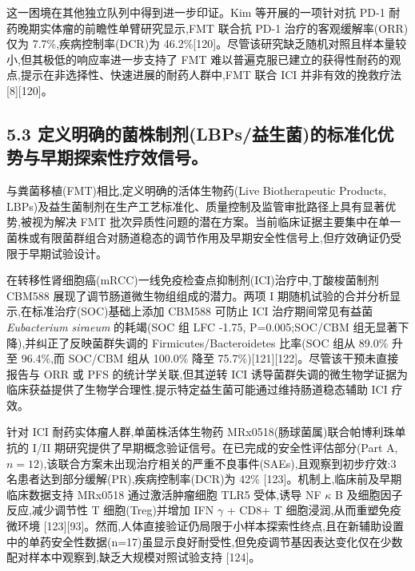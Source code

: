 这一困境在其他独立队列中得到进一步印证。Kim 等开展的一项针对抗 PD-1 耐药晚期实体瘤的前瞻性单臂研究显示,FMT 联合抗 PD-1 治疗的客观缓解率(ORR)仅为 7.7\%,疾病控制率(DCR)为 46.2\%{[}120{]}。尽管该研究缺乏随机对照且样本量较小,但其极低的响应率进一步支持了 FMT 难以普遍克服已建立的获得性耐药的观点,提示在非选择性、快速进展的耐药人群中,FMT 联合 ICI 并非有效的挽救疗法 {[}8{]}{[}120{]}。

\subsection{5.3 定义明确的菌株制剂(LBPs/益生菌)的标准化优势与早期探索性疗效信号。}\label{ux5b9aux4e49ux660eux786eux7684ux83ccux682aux5236ux5242lbpsux76caux751fux83ccux7684ux6807ux51c6ux5316ux4f18ux52bfux4e0eux65e9ux671fux63a2ux7d22ux6027ux7597ux6548ux4fe1ux53f7}

与粪菌移植(FMT)相比,定义明确的活体生物药(Live Biotherapeutic Products, LBPs)及益生菌制剂在生产工艺标准化、质量控制及监管审批路径上具有显著优势,被视为解决 FMT 批次异质性问题的潜在方案。当前临床证据主要集中在单一菌株或有限菌群组合对肠道稳态的调节作用及早期安全性信号上,但疗效确证仍受限于早期试验设计。

在转移性肾细胞癌(mRCC)一线免疫检查点抑制剂(ICI)治疗中,丁酸梭菌制剂 CBM588 展现了调节肠道微生物组组成的潜力。两项 I 期随机试验的合并分析显示,在标准治疗(SOC)基础上添加 CBM588 可防止 ICI 治疗期间常见有益菌 \emph{Eubacterium siraeum} 的耗竭(SOC 组 LFC -1.75, P=0.005;SOC/CBM 组无显著下降),并纠正了反映菌群失调的 Firmicutes/Bacteroidetes 比率(SOC 组从 89.0\% 升至 96.4\%,而 SOC/CBM 组从 100.0\% 降至 75.7\%){[}121{]}{[}122{]}。尽管该干预未直接报告与 ORR 或 PFS 的统计学关联,但其逆转 ICI 诱导菌群失调的微生物学证据为临床获益提供了生物学合理性,提示特定益生菌可能通过维持肠道稳态辅助 ICI 疗效。

针对 ICI 耐药实体瘤人群,单菌株活体生物药 MRx0518(肠球菌属)联合帕博利珠单抗的 I/II 期研究提供了早期概念验证信号。在已完成的安全性评估部分(Part A, \(n=12)\),该联合方案未出现治疗相关的严重不良事件(SAEs),且观察到初步疗效:3 名患者达到部分缓解(PR),疾病控制率(DCR)为 42\% {[}123{]}。机制上,临床前及早期临床数据支持 MRx0518 通过激活肿瘤细胞 TLR5 受体,诱导 NF \(\kappa\) B 及细胞因子反应,减少调节性 T 细胞(Treg)并增加 IFN \(\gamma\) + CD8+ T 细胞浸润,从而重塑免疫微环境 {[}123{]}{[}93{]}。然而,人体直接验证仍局限于小样本探索性终点,且在新辅助设置中的单药安全性数据(n=17)虽显示良好耐受性,但免疫调节基因表达变化仅在少数配对样本中观察到,缺乏大规模对照试验支持 {[}124{]}。

